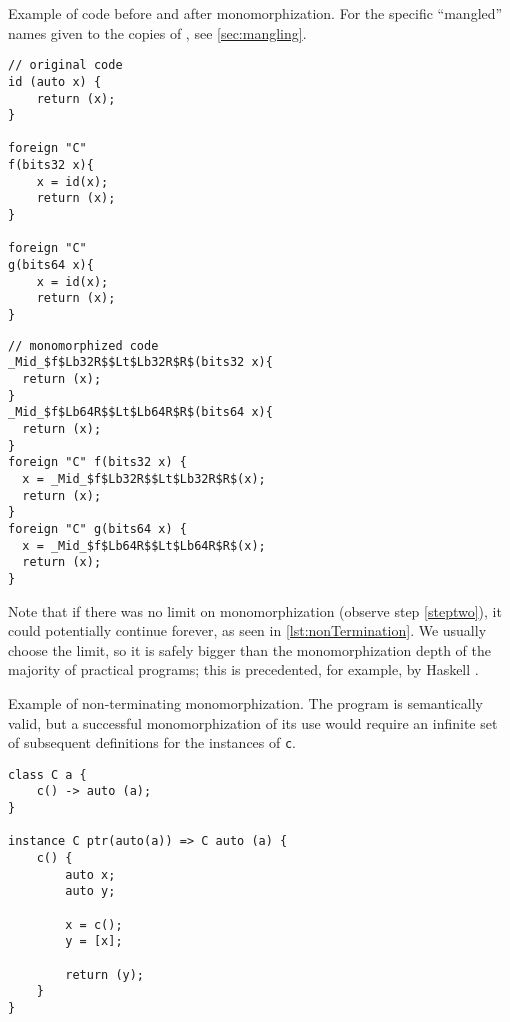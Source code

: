 \begin{codex}
    \caption{Example of code before and after monomorphization. For the specific ``mangled'' names given to the copies of , see \cref{sec:mangling}.}
    \label{lst:mono}
    \begin{center}
    \begin{minipage}{0.4\linewidth}
    \begin{lstlisting}
// original code
id (auto x) {
    return (x);
}

foreign "C"
f(bits32 x){
    x = id(x);
    return (x);
}

foreign "C"
g(bits64 x){
    x = id(x);
    return (x);
}
\end{lstlisting}
    \end{minipage}%
    \begin{minipage}{0.6\linewidth}
    \begin{lstlisting}
// monomorphized code
_Mid_$f$Lb32R$$Lt$Lb32R$R$(bits32 x){
  return (x);
}
_Mid_$f$Lb64R$$Lt$Lb64R$R$(bits64 x){
  return (x);
}
foreign "C" f(bits32 x) {
  x = _Mid_$f$Lb32R$$Lt$Lb32R$R$(x);
  return (x);
}
foreign "C" g(bits64 x) {
  x = _Mid_$f$Lb64R$$Lt$Lb64R$R$(x);
  return (x);
}
\end{lstlisting}
    \end{minipage}

    \end{center}
\end{codex}

Note that if there was no limit on monomorphization (observe step \ref{steptwo}), it could potentially continue forever, as seen in \cref{lst:nonTermination}. We usually choose the limit, so it is safely bigger than the monomorphization depth of the majority of practical programs; this is precedented, for example, by Haskell \cite{haskell2010}.

\begin{codex}
    \caption{Example of non-terminating monomorphization. The program is semantically valid, but a successful monomorphization of its use would require an infinite set of subsequent definitions for the instances of \texttt{c}.}
    \label{lst:nonTermination}

    \begin{lstlisting}
class C a {
    c() -> auto (a);
}

instance C ptr(auto(a)) => C auto (a) {
    c() {
        auto x;
        auto y;

        x = c();
        y = [x];

        return (y);
    }
}
    \end{lstlisting}
\end{codex}

